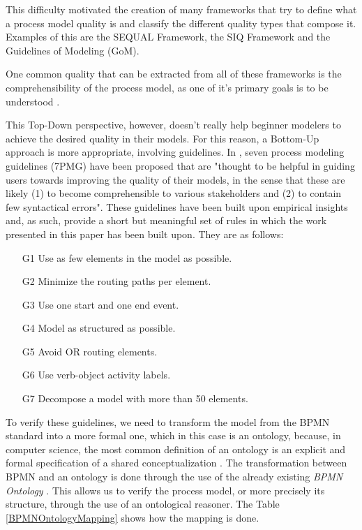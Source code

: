 \documentclass{llncs}
\begin{document}
This difficulty motivated the creation of many frameworks that try to define what a process model quality is and classify the different quality types that compose it. Examples of this are the SEQUAL Framework, the SIQ Framework and the Guidelines of Modeling (GoM).

One common quality that can be extracted from all of these frameworks is the comprehensibility of the process model, as one of it's primary goals is to be understood \cite{krogstie2012}.

This Top-Down perspective, however, doesn't really help beginner modelers to achieve the desired quality in their models. For this reason, a Bottom-Up approach is more appropriate, involving guidelines. In \cite{Mendling2010}, seven process modeling guidelines (7PMG) have been proposed that are "thought to be helpful in guiding users towards improving the quality of their models, in the sense that these are likely (1) to become comprehensible to various stakeholders and (2) to contain few syntactical errors". These guidelines have been built upon empirical insights and, as such, provide a short but meaningful set of rules in which the work presented in this paper has been built upon. They are as follows:
\begin{enumerate}
	\item[G1] Use as few elements in the model as possible.
	\item[G2] Minimize the routing paths per element.
	\item[G3] Use one start and one end event.
	\item[G4] Model as structured as possible. 
	\item[G5] Avoid OR routing elements.
	\item[G6] Use verb-object activity labels.
	\item[G7] Decompose a model with more than 50 elements.
\end{enumerate}

To verify these guidelines, we need to transform the model from the BPMN standard into a more formal one, which in this case is an ontology, because, in computer science, the most common definition of an ontology is an explicit and formal specification of a shared conceptualization \cite{borst1997ontology, Gruber1995907, Studer1998161}. The transformation between BPMN and an ontology is done through the use of the already existing \textit{BPMN Ontology} \cite{Rospocher2014foisbpmn}. This allows us to verify the process model, or more precisely its structure, through the use of an ontological reasoner. 
The Table \ref{BPMNOntologyMapping} shows how the mapping is done.
\end{document}
